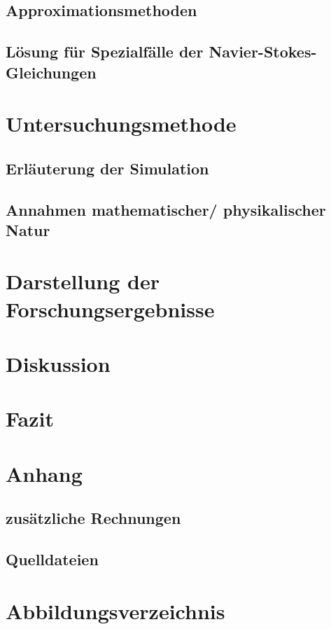 \documentclass[11pt,a4paper]{article}
\theoremstyle{definition}
\numberwithin{equation}{section} %
\begin{document}


\subsection{Approximationsmethoden}



\subsection{Lösung für Spezialfälle der Navier-Stokes-Gleichungen}

\section{Untersuchungsmethode}

\subsection{Erläuterung der Simulation}

\label{sec:sim}

\subsection{Annahmen mathematischer/ physikalischer Natur}

\section{Darstellung der Forschungsergebnisse}

\section{Diskussion}

\section{Fazit}

\section{Anhang}

\subsection{zusätzliche Rechnungen}

\label{sec:rechnungen}



\subsection{Quelldateien}

\section{Abbildungsverzeichnis}

\printbibliography
\end{document}
